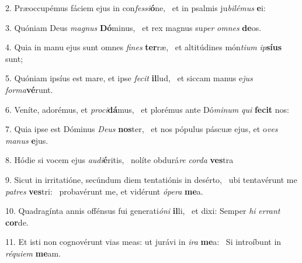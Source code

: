 2. Præoccupémus fáciem ejus in con\textit{fes}\textit{si}\textbf{ó}ne, \ast\  et in psalmis ju\textit{bi}\textit{lé}\textit{mus} \textbf{e}i:\

3. Quóniam Deus \textit{ma}\textit{gnus} \textbf{Dó}minus, \ast\  et rex magnus su\textit{per} \textit{om}\textit{nes} \textbf{de}os.\

4. Quia in manu ejus sunt omnes \textit{fi}\textit{nes} \textbf{ter}ræ, \ast\  et altitúdines món\textit{ti}\textit{um} \textit{ip}\textbf{sí}\textbf{us} sunt;\

5. Quóniam ipsíus est mare, et ipse \textit{fe}\textit{cit} \textbf{il}lud, \ast\  et siccam manus e\textit{jus} \textit{for}\textit{ma}\textbf{vé}runt.\

6. Veníte, adorémus, et \textit{pro}\textit{ci}\textbf{dá}mus, \ast\  et plorémus ante Dó\textit{mi}\textit{num} \textit{qui} \textbf{fe}\textbf{cit} nos:\

7. Quia ipse est Dóminus \textit{De}\textit{us} \textbf{nos}ter, \ast\  et nos pópulus páscuæ ejus, et o\textit{ves} \textit{ma}\textit{nus} \textbf{e}jus.\

8. Hódie si vocem ejus \textit{au}\textit{di}\textbf{é}ritis, \ast\  nolíte obdurá\textit{re} \textit{cor}\textit{da} \textbf{ves}tra\

9. Sicut in irritatióne, secúndum diem tentatiónis in desérto, \dag\  ubi tentavérunt me \textit{pa}\textit{tres} \textbf{ves}tri: \ast\  probavérunt me, et vidérunt \textit{ó}\textit{pe}\textit{ra} \textbf{me}a.\

10. Quadragínta annis offénsus fui generati\textit{ó}\textit{ni} \textbf{il}li, \ast\  et dixi: Semper \textit{hi} \textit{er}\textit{rant} \textbf{cor}de.\

11. Et isti non cognovérunt vias meas: ut jurávi in \textit{i}\textit{ra} \textbf{me}a: \ast\  Si introíbunt in \textit{ré}\textit{qui}\textit{em} \textbf{me}am.\

